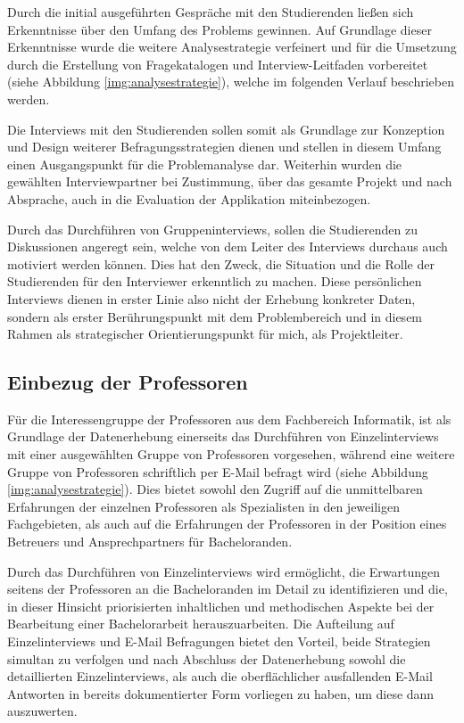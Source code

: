 \documentclass[bibliography=totoc,listof=totoc,BCOR=5mm,DIV=12,oneside]{scrbook}
\begin{document}
\par Durch die initial ausgeführten Gespräche mit den Studierenden ließen sich Erkenntnisse über den Umfang des Problems gewinnen. Auf Grundlage dieser Erkenntnisse wurde die weitere Analysestrategie verfeinert und für die Umsetzung durch die Erstellung von Fragekatalogen und Interview-Leitfaden vorbereitet (siehe Abbildung \ref{img:analysestrategie}), welche im folgenden Verlauf beschrieben werden.
\par Die Interviews mit den Studierenden sollen somit als Grundlage zur Konzeption und Design weiterer Befragungsstrategien dienen und stellen in diesem Umfang einen Ausgangspunkt für die Problemanalyse dar. Weiterhin wurden die gewählten Interviewpartner bei Zustimmung, über das gesamte Projekt und nach Absprache, auch in die Evaluation der Applikation miteinbezogen.
\par\medskip Durch das Durchführen von Gruppeninterviews, sollen die Studierenden zu Diskussionen angeregt sein, welche von dem Leiter des Interviews durchaus auch motiviert werden können. Dies hat den Zweck, die Situation und die Rolle der Studierenden für den Interviewer erkenntlich zu machen.  Diese persönlichen Interviews dienen in erster Linie also nicht der Erhebung konkreter Daten, sondern als erster Berührungspunkt mit dem Problembereich und in diesem Rahmen als strategischer Orientierungspunkt für mich, als Projektleiter.

\subsection{Einbezug der Professoren}
\par Für die Interessengruppe der Professoren aus dem Fachbereich Informatik, ist als Grundlage der Datenerhebung einerseits das Durchführen von Einzelinterviews mit einer ausgewählten Gruppe von Professoren vorgesehen, während eine weitere Gruppe von Professoren schriftlich per E-Mail befragt wird (siehe Abbildung \ref{img:analysestrategie}). Dies bietet sowohl den Zugriff auf die unmittelbaren Erfahrungen der einzelnen Professoren als Spezialisten in den jeweiligen Fachgebieten, als auch auf die Erfahrungen der Professoren in der Position eines Betreuers und Ansprechpartners für Bacheloranden. 
\par Durch das Durchführen von Einzelinterviews wird ermöglicht, die Erwartungen seitens der Professoren an die Bacheloranden im Detail zu identifizieren und die, in dieser Hinsicht priorisierten inhaltlichen und methodischen Aspekte bei der Bearbeitung einer Bachelorarbeit herauszuarbeiten. Die Aufteilung auf Einzelinterviews und E-Mail Befragungen bietet den Vorteil, beide Strategien simultan zu verfolgen und nach Abschluss der Datenerhebung sowohl die detaillierten Einzelinterviews, als auch die oberflächlicher ausfallenden E-Mail Antworten in bereits dokumentierter Form vorliegen zu haben, um diese dann auszuwerten.
\end{document}
